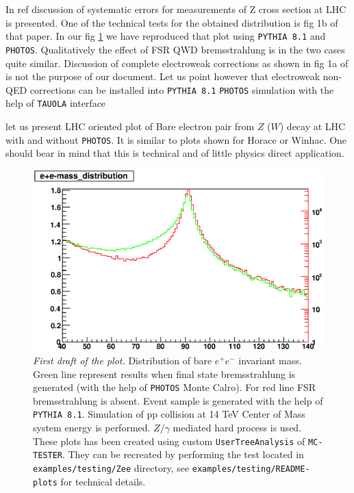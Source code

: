 \documentclass[]{Photos_interface_design}
\begin{document}
In ref \cite{Adam:2008ge} discussion of systematic errors for measurements of Z cross 
section at LHC is presented. One of the technical tests for the obtained 
distribution is fig 1b of that paper. In our fig \ref{fig:lineshape} we have 
reproduced that plot using {\tt PYTHIA 8.1} and {\tt PHOTOS}. Qualitatively the effect
of FSR QWD bremsstrahlung is in the two cases quite similar. Discussion
of complete electroweak corrections as shown in fig 1a of  \cite{Adam:2008ge}
is not the purpose of our document. Let us point however that electroweak 
non-QED corrections can be installed into {\tt PYTHIA 8.1} {\tt PHOTOS} simulation with 
the help of {\tt TAUOLA} interface \cite{Davidson:2010rw}

let us present LHC oriented plot of Bare electron pair from $Z$ ($W$) decay 
at LHC 
with and without {\tt PHOTOS}. It is similar to plots shown for Horace or Winhac. 
One should bear in mind that this is technical and of little physics direct 
application.
\begin{figure}[h!]
\centering
\includegraphics[scale=0.85]{lineshape.eps}
\caption{{\it First draft of the plot.} Distribution of bare $e^+e^-$ invariant mass. Green line represent results when final state 
bremsstrahlung is generated (with the help of {\tt PHOTOS} Monte Calro). For red line FSR 
bremsstrahlung is absent. Event sample is generated with the help of {\tt PYTHIA 8.1}.
Simulation of pp collision at 14 TeV Center of Mass system energy is performed.
$Z/\gamma$ mediated hard process is used.
These plots has been created using custom {\tt UserTreeAnalysis} of {\tt MC-TESTER}.
They can be recreated by performing the test located in {\tt examples/testing/Zee} directory, see  {\tt examples/testing/README-plots} for technical details.
\label{fig:lineshape}
}
\end{figure}
\end{document}
